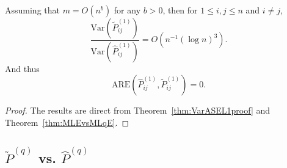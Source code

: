 \begin{theorem}
\label{thm:AREL1proof}
Assuming that $m = O(n^b)$ for any $b > 0$,  then for $1 \le i, j \le n$ and $i \ne j$,
\[
	\frac{\mathrm{Var}(\widetilde{P}_{ij}^{(1)})}{\mathrm{Var}(\hat{P}_{ij}^{(1)})}
    = O(n^{-1} (\log n)^3).
\]
And thus
\[
	\mathrm{ARE}(\hat{P}_{ij}^{(1)}, \widetilde{P}_{ij}^{(1)}) = 0.
\]
\end{theorem}
\begin{proof}
The results are direct from Theorem~\ref{thm:VarASEL1proof} and Theorem~\ref{thm:MLEvsMLqE}.
\end{proof}







\subsection{$\widetilde{P}^{(q)}$ vs. $\hat{P}^{(q)}$}
\label{section:pf_MLqEASEvsMLqE}

